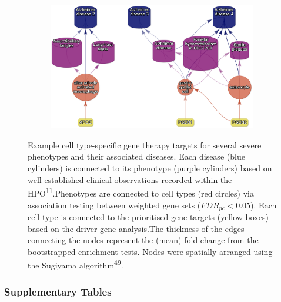 \documentclass[
]{agujournal2019}
\begin{document}
\begin{figure}
{\begin{figure}[H]
{\centering \includegraphics{img/fig-therapy-examples-supp/alzheimer.png}

}


\end{figure}%

}

\caption{\label{fig-therapy-examples-supp}Example cell type-specific
gene therapy targets for several severe phenotypes and their associated
diseases. Each disease (blue cylinders) is connected to its phenotype
(purple cylinders) based on well-established clinical observations
recorded within the HPO\textsuperscript{11}.Phenotypes are connected to
cell types (red circles) via association testing between weighted gene
sets (\(FDR_{pc}<0.05\)). Each cell type is connected to the prioritised
gene targets (yellow boxes) based on the driver gene analysis.The
thickness of the edges connecting the nodes represent the (mean)
fold-change from the bootstrapped enrichment tests. Nodes were spatially
arranged using the Sugiyama algorithm\textsuperscript{49}.}

\end{figure}%

\subsubsection{Supplementary Tables}\label{supplementary-tables}
\end{document}
